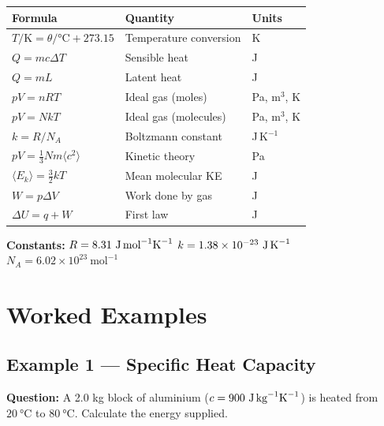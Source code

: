 \begin{minipage}{\linewidth}
\begin{tcolorbox}[colback=lightgold, colframe=accentgold]
\renewcommand{\arraystretch}{1.8}
\begin{tabular}{@{}lll@{}}
\toprule
\textbf{Formula} & \textbf{Quantity} & \textbf{Units} \\
\midrule
$T/\text{K} = \theta/\text{°C} + 273.15$ & Temperature conversion & K \\
$Q = mc\Delta T$ & Sensible heat & J \\
$Q = mL$ & Latent heat & J \\
$pV = nRT$ & Ideal gas (moles) & Pa, m$^3$, K \\
$pV = NkT$ & Ideal gas (molecules) & Pa, m$^3$, K \\
$k = R/N_A$ & Boltzmann constant & J\,K$^{-1}$ \\
$pV = \frac{1}{3}Nm\langle c^2 \rangle$ & Kinetic theory & Pa \\
$\langle E_k \rangle = \frac{3}{2}kT$ & Mean molecular KE & J \\
$W = p\Delta V$ & Work done by gas & J \\
$\Delta U = q + W$ & First law & J \\
\bottomrule
\end{tabular}
\end{tcolorbox}

\vspace{0.5em}
\begin{tcolorbox}[colback=lightblue, colframe=darkblue]
\textbf{Constants:}\quad
$R = 8.31\ \text{J\,mol}^{-1}\text{K}^{-1}$\quad
$k = 1.38\times10^{-23}\ \text{J\,K}^{-1}$\quad
$N_A = 6.02\times10^{23}\ \text{mol}^{-1}$
\end{tcolorbox}
\end{minipage}

\section{Worked Examples}

\subsection*{Example 1 --- Specific Heat Capacity}

\textbf{Question:} A 2.0 kg block of aluminium ($c = 900\ \text{J\,kg}^{-1}\text{K}^{-1}$) is heated from $20\ \text{°C}$ to $80\ \text{°C}$. Calculate the energy supplied.

